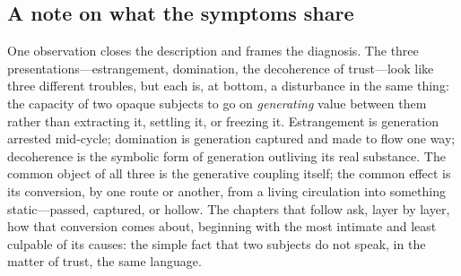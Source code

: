\subsection{A note on what the symptoms share}
\label{p17:sub:symptom-shared}

One observation closes the description and frames the diagnosis. The three presentations---estrangement, domination, the decoherence of trust---look like three different troubles, but each is, at bottom, a disturbance in the same thing: the capacity of two opaque subjects to go on \emph{generating} value between them rather than extracting it, settling it, or freezing it. Estrangement is generation arrested mid-cycle; domination is generation captured and made to flow one way; decoherence is the symbolic form of generation outliving its real substance. The common object of all three is the generative coupling itself; the common effect is its conversion, by one route or another, from a living circulation into something static---passed, captured, or hollow. The chapters that follow ask, layer by layer, how that conversion comes about, beginning with the most intimate and least culpable of its causes: the simple fact that two subjects do not speak, in the matter of trust, the same language.
